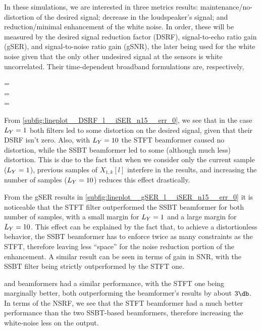 In these simulations, we are interested in three metrics results: maintenance/no-distortion of the desired signal; decrease in the loudspeaker's signal; and reduction/minimal enhancement of the white noise. In order, these will be measured by the desired signal reduction factor (DSRF), signal-to-echo ratio gain (gSER), and signal-to-noise ratio gain (gSNR), the later being used for the white noise given that the only other undesired signal at the sensors is white uncorrelated. Their time-dependent broadband formulations are, respectively,
\begin{subgather}
	\dsrf[l] =  \\
	\gser[l] =  \cdot {} \\
	\gsnr[l] =  \cdot {}
\end{subgather}

From \cref{subfig:lineplot__DSRF_l__iSER_n15__err_0}, we see that in the case $\Ly = 1$ both filters led to some distortion on the desired signal, given that their DSRF isn't zero. Also, with $\Ly = 10$ the STFT beamformer caused no distortion, while the SSBT beamformer led to some (although much less) distortion. This is due to the fact that when we consider only the current sample ($\Ly = 1$), previous samples of $X_{1,k}[l]$ interfere in the results, and increasing the number of samples ($\Ly = 10$) reduces this effect drastically.

From the gSER results in \cref{subfig:lineplot__gSER_l__iSER_n15__err_0} it is noticeable that the STFT filter outperformed the SSBT beamformer for both number of samples, with a small margin for $\Ly = 1$ and a large margin for $\Ly = 10$. This effect can be explained by the fact that, to achieve a distortionless behavior, the SSBT beamformer has to enforce twice as many constraints as the STFT, therefore leaving less ``space'' for the noise reduction portion of the enhancement. A similar result can be seen in terms of gain in SNR, with the SSBT filter being strictly outperformed by the STFT one.

and \nssbt{} beamformers had a similar performance, with the STFT one being marginally better, both outperforming the \nssbt{} beamformer's results by about $3\dB$. In terms of the NSRF, we see that the STFT beamformer had a much better performance than the two SSBT-based beamformers, therefore increasing the white-noise less on the output.

